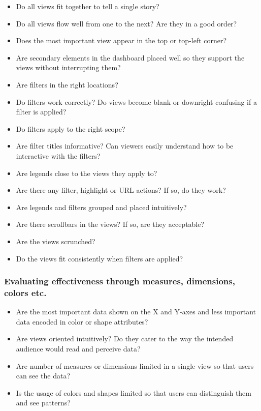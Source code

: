 \documentclass[]{book}
\providecommand{\tightlist}{%
  \setlength{\itemsep}{0pt}\setlength{\parskip}{0pt}}
\begin{document}
\begin{itemize}
\tightlist
\item
  Do all views fit together to tell a single story?
\item
  Do all views flow well from one to the next? Are they in a good order?
\item
  Does the most important view appear in the top or top-left corner?
\item
  Are secondary elements in the dashboard placed well so they support the views without interrupting them?
\item
  Are filters in the right locations?
\item
  Do filters work correctly? Do views become blank or downright confusing if a filter is applied?
\item
  Do filters apply to the right scope?
\item
  Are filter titles informative? Can viewers easily understand how to be interactive with the filters?
\item
  Are legends close to the views they apply to?
\item
  Are there any filter, highlight or URL actions? If so, do they work?
\item
  Are legends and filters grouped and placed intuitively?
\item
  Are there scrollbars in the views? If so, are they acceptable?
\item
  Are the views scrunched?
\item
  Do the views fit consistently when filters are applied?
\end{itemize}

\hypertarget{evaluating-effectiveness-through-measures-dimensions-colors-etc.}{%
\subsubsection{Evaluating effectiveness through measures, dimensions, colors etc.}\label{evaluating-effectiveness-through-measures-dimensions-colors-etc.}}

\begin{itemize}
\tightlist
\item
  Are the most important data shown on the X and Y-axes and less important data encoded in color or shape attributes?
\item
  Are views oriented intuitively? Do they cater to the way the intended audience would read and perceive data?
\item
  Are number of measures or dimensions limited in a single view so that users can see the data?
\item
  Is the usage of colors and shapes limited so that users can distinguish them and see patterns?
\end{itemize}
\end{document}
